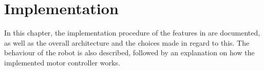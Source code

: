 \chapter{Implementation} \label{cha:implementation}

In this chapter, the implementation procedure of the features in  are documented, as well as the overall architecture and the choices made in regard to this. The behaviour of the robot is also described, followed by an explanation on how the implemented motor controller works.










%
%
%

%
